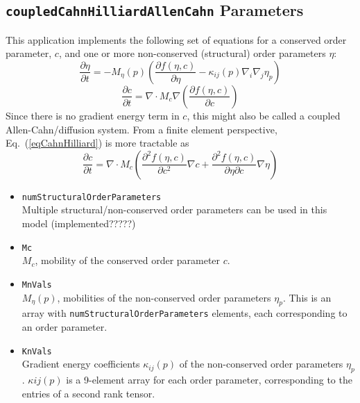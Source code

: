 \documentclass[11pt]{article}
\begin{document}
\subsection{\texttt{coupledCahnHilliardAllenCahn} Parameters}
This application implements the following set of equations for a conserved order parameter, $c$, and one or more non-conserved (structural) order parameters $\eta$:
\begin{equation}
\frac{\partial \eta}{\partial t} = -M_\eta(p) \left( \frac{\partial f(\eta,c)}{\partial \eta} - \kappa_{ij}(p) \nabla_i \nabla_j \eta_p \right)
\label{eqAllenCahn}
\end{equation}
\begin{equation}
\frac{\partial c}{\partial t} = \nabla \cdot M_c \nabla \left( \frac{\partial f(\eta,c)}{\partial c} \right)
\label{eqCahnHilliard}
\end{equation}
Since there is no gradient energy term in $c$, this might also be called a coupled Allen-Cahn/diffusion system.  From a finite element perspective, Eq.~(\ref{eqCahnHilliard}) is more tractable as
\begin{equation}
\frac{\partial c}{\partial t} = \nabla \cdot M_c \left( \frac{\partial^2 f(\eta,c)}{\partial c^2} \nabla c + \frac{\partial^2 f(\eta,c)}{\partial \eta \partial c } \nabla \eta \right)
\label{eqCahnHilliardFE}
\end{equation}
\begin{itemize}
\item \texttt{numStructuralOrderParameters}\\
	Multiple structural/non-conserved order parameters can be used in this model (implemented?????)
\item \texttt{Mc} \\
	$M_c$, mobility of the conserved order parameter $c$.
\item \texttt{MnVals} \\
	$M_\eta(p)$, mobilities of the non-conserved order parameters $\eta_p$.  This is an array with \texttt{numStructuralOrderParameters} elements, each corresponding to an order parameter.
\item \texttt{KnVals} \\
	Gradient energy coefficients $\kappa_{ij}(p)$ of the non-conserved order parameters $\eta_p$.  $\kappa{ij}(p)$ is a 9-element array for each order parameter, corresponding to the entries of a second rank tensor.
\end{itemize}
\end{document}
